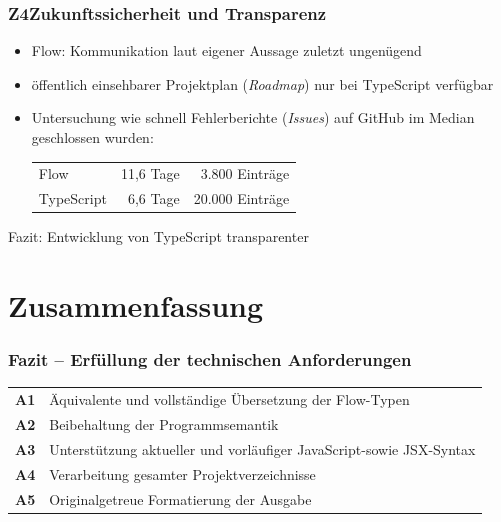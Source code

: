       \begin{frame}
        \frametitle{Z4\hspace{0.75em}Zukunftssicherheit und Transparenz}
        \begin{itemize}
          \item Flow: Kommunikation laut eigener Aussage zuletzt ungenügend~\autocite{FLOW:UPDATE_2019}
          \item öffentlich einsehbarer Projektplan (\textit{Roadmap}) nur bei TypeScript verfügbar
          \item Untersuchung wie schnell Fehlerberichte (\textit{Issues}) auf GitHub im Median geschlossen wurden:\\
            \vspace{.5em}
            {
              \footnotesize
              \begin{tabu}{@{}lrr@{}}
                Flow & 11,6 Tage & 3.800 Einträge \\
                TypeScript & 6,6 Tage & 20.000 Einträge \\
              \end{tabu}
            }
        \end{itemize}
        \vspace{1em}
        Fazit: Entwicklung von TypeScript transparenter
      \end{frame}

  \section{Zusammenfassung}

    \begin{frame}
      \frametitle{Fazit -- Erfüllung der technischen Anforderungen}
      {
        \renewcommand{\arraystretch}{1.75}
        \begin{tabu} to 
          \textbf{A1} & Äquivalente und vollständige Übersetzung der Flow-Typen \\
          \textbf{A2} & Beibehaltung der Programmsemantik \\
          \textbf{A3} & Unterstützung aktueller und vorläufiger JavaScript-\newline sowie JSX-Syntax \\
          \textbf{A4} & Verarbeitung gesamter Projektverzeichnisse \\
          \textbf{A5} & Originalgetreue Formatierung der Ausgabe \\
        \end{tabu}
      }
    \end{frame}

